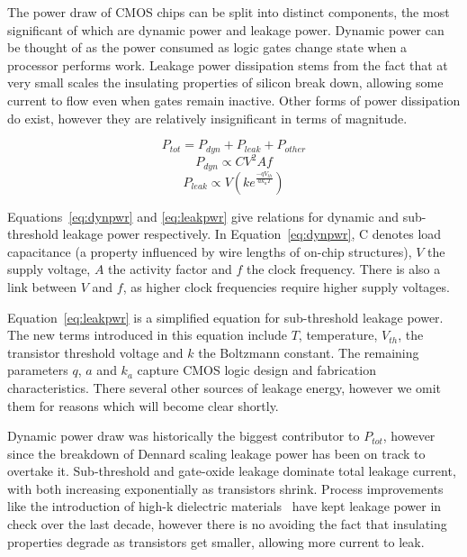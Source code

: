 The power draw of CMOS chips can be split into distinct components, the most significant of which are dynamic power and leakage power. Dynamic power can be thought of as the power consumed as logic gates change state when a processor performs work. Leakage power dissipation stems from the fact that at very small scales the insulating properties of silicon break down, allowing some current to flow even when gates remain inactive. Other forms of power dissipation do exist, however they are relatively insignificant in terms of magnitude. 




\begin{equation}
\label{eq:totpwr}
P_{tot} = P_{dyn} + P_{leak} + P_{other}
\end{equation}
\begin{equation} 
\label{eq:dynpwr}
P_{dyn} \propto CV^{2}Af
\end{equation}
\begin{equation}
\label{eq:leakpwr}
P_{leak} \propto V\left(ke^{\frac{-qV_{th}}{ak_{a}T}}\right)
\end{equation}

Equations~\ref{eq:dynpwr} and \ref{eq:leakpwr} give relations for dynamic and sub-threshold leakage power respectively. In Equation~\ref{eq:dynpwr}, C denotes load capacitance (a property influenced by wire lengths of on-chip structures), $V$ the supply voltage, $A$ the activity factor and $f$ the clock frequency. There is also a link between $V$ and $f$, as higher clock frequencies require higher supply voltages.

Equation~\ref{eq:leakpwr} is a simplified equation for sub-threshold leakage power. The new terms introduced in this equation include $T$, temperature, $V_{th}$, the transistor threshold voltage and $k$ the Boltzmann constant. The remaining parameters $q$, $a$ and $k_{a}$ capture CMOS logic design and fabrication characteristics. There several other sources of leakage energy, however we omit them for reasons which will  become clear shortly.

Dynamic power draw was historically the biggest contributor to $P_{tot}$, however since the breakdown of Dennard scaling leakage power has been on track to overtake it.  Sub-threshold and gate-oxide leakage dominate total leakage current, with both increasing exponentially as transistors shrink. Process improvements like the introduction of high-k dielectric materials~\cite{jan:2009aa} have kept leakage power in check over the last decade, however there is no avoiding the fact that insulating properties degrade as transistors get smaller, allowing more current to leak.

